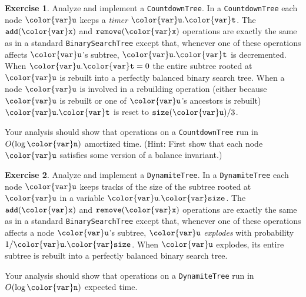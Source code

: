 \documentclass[10pt]{book}
\theoremstyle{plain}
\theoremstyle{definition}
\newtheorem{exc}{Exercise}[chapter]
\begin{document}
\begin{exc}
  Analyze and implement a \texttt{CountdownTree}.  In a \texttt{CountdownTree} each
  node \ensuremath{\mathtt{{\color{var}u}}} keeps a \emph{timer} \ensuremath{\mathtt{{\color{var}u}.{\color{var}t}}}.  The \ensuremath{\mathtt{add({\color{var}x})}} and \ensuremath{\mathtt{remove({\color{var}x})}}
  operations are exactly the same as in a standard \texttt{BinarySearchTree}
  except that, whenever one of these operations affects \ensuremath{\mathtt{{\color{var}u}}}'s subtree,
  \ensuremath{\mathtt{{\color{var}u}.{\color{var}t}}} is decremented.  When $\ensuremath{\mathtt{{\color{var}u}.{\color{var}t}}}=0$ the entire subtree rooted at \ensuremath{\mathtt{{\color{var}u}}}
  is rebuilt into a perfectly balanced binary search tree.  When a node
  \ensuremath{\mathtt{{\color{var}u}}} is involved in a rebuilding operation (either because \ensuremath{\mathtt{{\color{var}u}}} is rebuilt
  or one of \ensuremath{\mathtt{{\color{var}u}}}'s ancestors is rebuilt) \ensuremath{\mathtt{{\color{var}u}.{\color{var}t}}} is reset to $\ensuremath{\mathtt{size({\color{var}u})}}/3$.

  Your analysis should show that operations on a \texttt{CountdownTree} run
  in $O(\log \ensuremath{\mathtt{{\color{var}n}}})$ amortized time.  (Hint: First show that each node \ensuremath{\mathtt{{\color{var}u}}}
  satisfies some version of a balance invariant.)
\end{exc}

\begin{exc}
  Analyze and implement a \texttt{DynamiteTree}.  In a \texttt{DynamiteTree} each
  node \ensuremath{\mathtt{{\color{var}u}}} keeps tracks of the size of the subtree rooted at \ensuremath{\mathtt{{\color{var}u}}} in a
  variable \ensuremath{\mathtt{{\color{var}u}.{\color{var}size}}}.  The \ensuremath{\mathtt{add({\color{var}x})}} and \ensuremath{\mathtt{remove({\color{var}x})}} operations are exactly
  the same as in a standard \texttt{BinarySearchTree} except that, whenever one
  of these operations affects a node \ensuremath{\mathtt{{\color{var}u}}}'s subtree, \ensuremath{\mathtt{{\color{var}u}}} \emph{explodes}
  with probability $1/\ensuremath{\mathtt{{\color{var}u}.{\color{var}size}}}$.  When \ensuremath{\mathtt{{\color{var}u}}} explodes, its entire subtree
  is rebuilt into a perfectly balanced binary search tree.

  Your analysis should show that operations on a \texttt{DynamiteTree} run
  in $O(\log \ensuremath{\mathtt{{\color{var}n}}})$ expected time. 
\end{exc}
 
\end{document}
